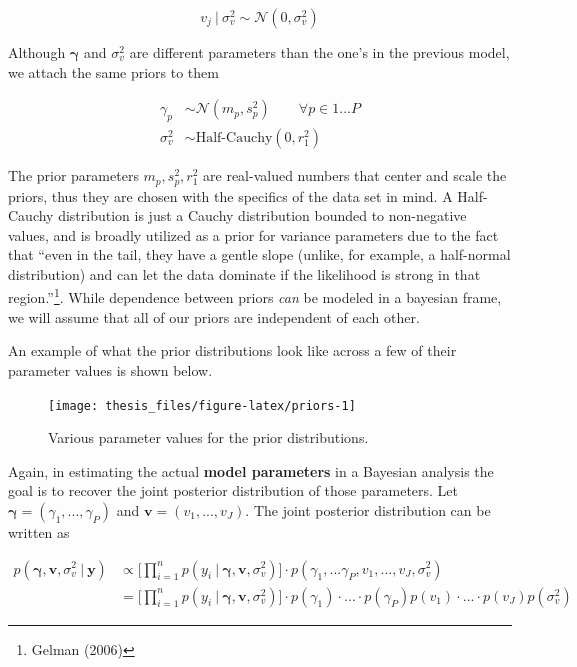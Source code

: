 \documentclass[12pt,twoside]{reedthesis}
\begin{document}
\[
v_j \ | \ \sigma_{v}^2 \sim \mathcal{N}(0, \sigma_{v}^2)
\]

Although \(\boldsymbol{\gamma}\) and \(\sigma_{v}^2\) are different parameters than the one's in the previous model, we attach the same priors to them

\[
\begin{aligned}
\gamma_p &\sim \mathcal{N}(m_p, s_p^2)  \qquad \forall p\in 1...P \\
\sigma_{v}^2 &\sim \text{Half-Cauchy}(0, r_1^2)
\end{aligned}
\]

The prior parameters \(m_p, s_p^2, r_1^2\) are real-valued numbers that center and scale the priors, thus they are chosen with the specifics of the data set in mind. A Half-Cauchy distribution is just a Cauchy distribution bounded to non-negative values, and is broadly utilized as a prior for variance parameters due to the fact that ``even in the tail, they have a gentle slope (unlike, for example, a half-normal distribution) and can let the data dominate if the likelihood is strong in that region.''\footnote{Gelman (2006)}. While dependence between priors \emph{can} be modeled in a bayesian frame, we will assume that all of our priors are independent of each other.

An example of what the prior distributions look like across a few of their parameter values is shown below.
\begin{figure}

{\centering \texttt{[image: thesis\_files/figure-latex/priors-1]} 

}

\caption{Various parameter values for the prior distributions.}\label{fig:priors}
\end{figure}
Again, in estimating the actual \textbf{model parameters} in a Bayesian analysis the goal is to recover the joint posterior distribution of those parameters. Let \(\boldsymbol{\gamma} = (\gamma_1, ...,\gamma_P)\) and \(\mathbf{v} = (v_1, ..., v_J)\). The joint posterior distribution can be written as

\[
\begin{aligned}
p(\boldsymbol{\gamma}, \mathbf{v},  \sigma_v^2 \ | \ \mathbf{y}) &\propto \bigg[\prod_{i=1}^np(y_i \ | \ \boldsymbol{\gamma}, \mathbf{v},  \sigma_v^2)\bigg]\cdot p(\gamma_1, ...\gamma_P, v_1,... ,v_J, \sigma_{v}^2) \\
 &= \bigg[\prod_{i=1}^np(y_i \ | \ \boldsymbol{\gamma}, \mathbf{v},  \sigma_{v}^2)\bigg]\cdot p(\gamma_1)\cdot...\cdot p(\gamma_P)p(v_1) \cdot ... \cdot p(v_J)p(\sigma_{v}^2)
\end{aligned}
\]
\end{document}
